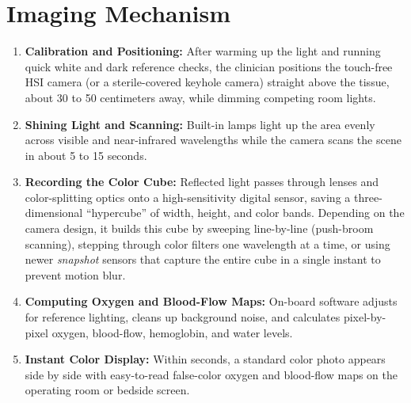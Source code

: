 \section{Imaging Mechanism}
\begin{enumerate}
    \item \textbf{Calibration and Positioning:} After warming up the light and running quick white and dark reference checks, the clinician positions the touch-free HSI camera (or a sterile-covered keyhole camera) straight above the tissue, about 30 to 50 centimeters away, while dimming competing room lights.
    \item \textbf{Shining Light and Scanning:} Built-in lamps light up the area evenly across visible and near-infrared wavelengths while the camera scans the scene in about 5 to 15 seconds.
    \item \textbf{Recording the Color Cube:} Reflected light passes through lenses and color-splitting optics onto a high-sensitivity digital sensor, saving a three-dimensional ``hypercube'' of width, height, and color bands. Depending on the camera design, it builds this cube by sweeping line-by-line (push-broom scanning), stepping through color filters one wavelength at a time, or using newer \textit{snapshot} sensors that capture the entire cube in a single instant to prevent motion blur.
    \item \textbf{Computing Oxygen and Blood-Flow Maps:} On-board software adjusts for reference lighting, cleans up background noise, and calculates pixel-by-pixel oxygen, blood-flow, hemoglobin, and water levels.
    \item \textbf{Instant Color Display:} Within seconds, a standard color photo appears side by side with easy-to-read false-color oxygen and blood-flow maps on the operating room or bedside screen.
\end{enumerate}

